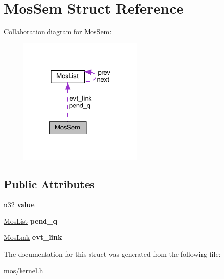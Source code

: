 \hypertarget{structMosSem}{}\section{Mos\+Sem Struct Reference}
\label{structMosSem}


Collaboration diagram for Mos\+Sem\+:\nopagebreak
\begin{figure}[H]
\begin{center}
\leavevmode
\includegraphics[width=174pt]{structMosSem__coll__graph}
\end{center}
\end{figure}
\subsection*{Public Attributes}
\begin{DoxyCompactItemize}
\item 
\mbox{\label{structMosSem_a0085aae7b8bf75b68045b55d4a076f2b}} 
u32 {\bfseries value}
\item 
\mbox{\label{structMosSem_a0b6f281d95d804efcb503f7dba875dc3}} 
\hyperlink{structMosList}{Mos\+List} {\bfseries pend\+\_\+q}
\item 
\mbox{\label{structMosSem_ac70d34b4f737bdc203d08af974a6903b}} 
\hyperlink{structMosList}{Mos\+Link} {\bfseries evt\+\_\+link}
\end{DoxyCompactItemize}


The documentation for this struct was generated from the following file\+:\begin{DoxyCompactItemize}
\item 
mos/\hyperlink{kernel_8h}{kernel.\+h}\end{DoxyCompactItemize}
